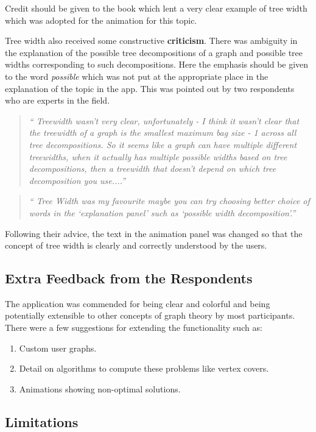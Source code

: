 Credit should be given to the book \cite{KleinbergTardos06} which lent a very
clear example of tree width which was adopted for the animation for this topic.

Tree width also received some constructive \textbf{criticism}. There was
ambiguity in the explanation of the possible tree decompositions of a graph and
possible tree widths corresponding to such decompositions. Here the emphasis
should be given to the word \emph{possible} which was not put at the appropriate
place in the explanation of the topic in the app. This was pointed out
by two respondents who are experts in the field. 

\begin{quote}
\emph{``
Treewidth wasn't very clear, unfortunately - I think it wasn't clear that the
treewidth of a graph is the smallest maximum bag size - 1 across all tree
decompositions. So it seems like a graph can have multiple different
treewidths, when it actually has multiple possible widths based on tree
decompositions, then a treewidth that doesn't depend on which tree
decomposition you use....''}
\end{quote}
\begin{quote}
\emph{``
Tree Width was my favourite maybe
you can try choosing better choice of words in the `explanation panel'  such as
`possible width decomposition'.''}
\end{quote}

Following their advice, the text in the animation panel was changed so that
the concept of tree width is clearly and correctly understood by the users.


\subsection{Extra Feedback from the Respondents}
The application was commended for being clear and colorful and being
potentially extensible to other concepts of graph theory by most participants.
There were a few suggestions for extending the functionality such as:
\begin{enumerate}
\item Custom user graphs.
\item Detail on algorithms to compute these problems like vertex covers.
\item Animations showing non-optimal solutions.
\end{enumerate}


\subsection{Limitations}


